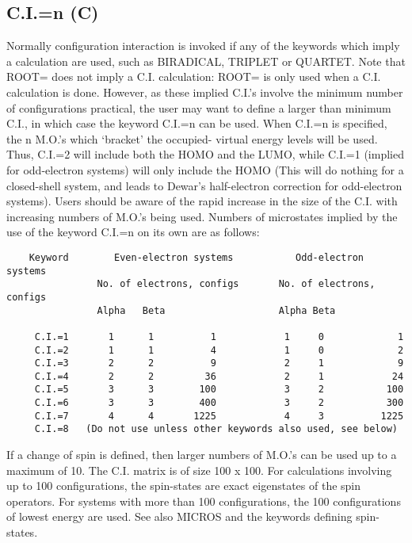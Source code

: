 \subsection*{C.I.=n (C)}
   Normally configuration interaction is invoked if any of the keywords
   which imply a  calculation are used, such as BIRADICAL, TRIPLET or
   QUARTET.  Note that ROOT= does not imply a  C.I. calculation:   ROOT=  is
   only  used  when  a  C.I. calculation is done.  However, as these implied
   C.I.'s involve the minimum number of configurations practical,  the  user
   may  want to define a larger than minimum C.I., in which case the keyword
   C.I.=n can be used.   When  C.I.=n  is  specified,  the  n  M.O.'s  which
   `bracket' the occupied- virtual energy levels will be used.  Thus, C.I.=2
   will include both the HOMO  and  the  LUMO,  while  C.I.=1  (implied  for
   odd-electron  systems)  will  only include the HOMO (This will do nothing
   for a closed-shell system, and leads to Dewar's half-electron  correction
   for  odd-electron  systems).  Users should be aware of the rapid increase
   in the size of the C.I. with increasing numbers  of  M.O.'s  being  used.
   Numbers  of  microstates  implied by the use of the keyword C.I.=n on its
   own are as follows:                    
\begin{verbatim}
    Keyword        Even-electron systems           Odd-electron systems
                No. of electrons, configs       No. of electrons, configs
                Alpha   Beta                    Alpha Beta
    
     C.I.=1       1      1          1            1     0             1
     C.I.=2       1      1          4            1     0             2
     C.I.=3       2      2          9            2     1             9
     C.I.=4       2      2         36            2     1            24
     C.I.=5       3      3        100            3     2           100
     C.I.=6       3      3        400            3     2           300
     C.I.=7       4      4       1225            4     3          1225
     C.I.=8   (Do not use unless other keywords also used, see below)
\end{verbatim}
    
    If a change of spin is defined, then larger numbers of M.O.'s can be
used  up  to a maximum of 10.  The C.I. matrix is of size 100 x 100.  For
calculations involving up to  100  configurations,  the  spin-states  are
exact  eigenstates of the spin operators.  For systems with more than 100
configurations, the 100 configurations of lowest energy  are  used.   See
also MICROS and the keywords defining spin-states.

